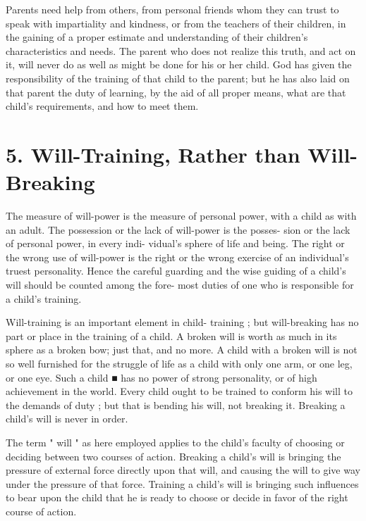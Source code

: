 \documentclass[
]{book}
\begin{document}
Parents need help from others, from personal friends whom they can trust to speak with impartiality and kindness, or from the teachers of their children, in the gaining of a proper estimate and understanding of their children's characteristics and needs. The parent who does not realize this truth, and act on it, will never do as well as might be done for his or her child. God has given the responsibility of the training of that child to the parent; but he has also laid on that parent the duty of learning, by the aid of all proper means, what are that child's requirements, and how to meet them.

\hypertarget{will-training-rather-than-will-breaking}{%
\chapter{5. Will-Training, Rather than Will-Breaking}\label{will-training-rather-than-will-breaking}}

The measure of will-power is the measure of personal power, with a child as with an adult. The possession or the lack of will-power is the posses- sion or the lack of personal power, in every indi- vidual's sphere of life and being. The right or the wrong use of will-power is the right or the wrong exercise of an individual's truest personality. Hence the careful guarding and the wise guiding of a child's will should be counted among the fore- most duties of one who is responsible for a child's training.

Will-training is an important element in child- training ; but will-breaking has no part or place in the training of a child. A broken will is worth as much in its sphere as a broken bow; just that, and no more. A child with a broken will is not so well furnished for the struggle of life as a child with only one arm, or one leg, or one eye. Such a child ■ has no power of strong personality, or of high achievement in the world. Every child ought to be trained to conform his will to the demands of duty ; but that is bending his will, not breaking it. Breaking a child's will is never in order.

The term " will " as here employed applies to the child's faculty of choosing or deciding between two courses of action. Breaking a child's will is bringing the pressure of external force directly upon that will, and causing the will to give way under the pressure of that force. Training a child's will is bringing such influences to bear upon the child that he is ready to choose or decide in favor of the right course of action.
\end{document}
